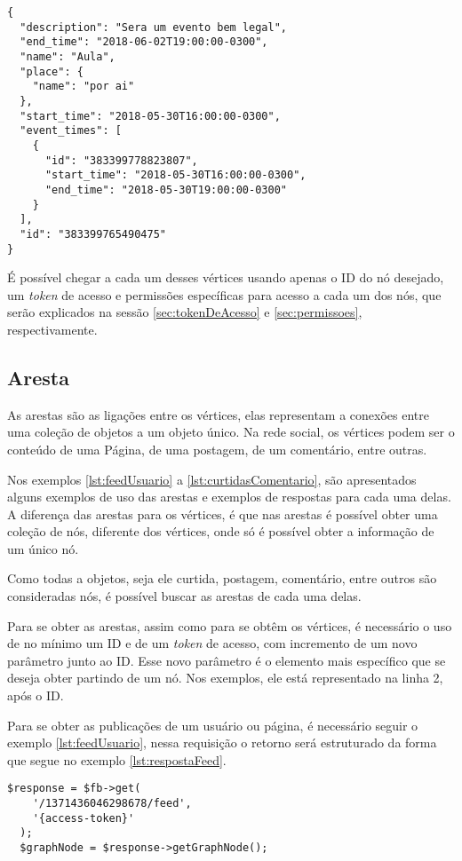 \begin{lstlisting}[caption={Resposta do servidor a uma requisição \ref{lst:evento} (Evento)},label={lst:retornoEvento}]
{
  "description": "Sera um evento bem legal",
  "end_time": "2018-06-02T19:00:00-0300",
  "name": "Aula",
  "place": {
    "name": "por ai"
  },
  "start_time": "2018-05-30T16:00:00-0300",
  "event_times": [
    {
      "id": "383399778823807",
      "start_time": "2018-05-30T16:00:00-0300",
      "end_time": "2018-05-30T19:00:00-0300"
    }
  ],
  "id": "383399765490475"
}
\end{lstlisting}

É possível chegar a cada um desses vértices usando apenas o ID do nó desejado, um \textit{token} de acesso e permissões específicas para acesso a cada um dos nós, que serão explicados na sessão \ref{sec:tokenDeAcesso} e \ref{sec:permissoes}, respectivamente.

\subsection{Aresta}
As arestas são as ligações entre os vértices, elas representam a conexões entre uma coleção de objetos a um objeto único. Na rede social, os vértices podem ser o conteúdo de uma Página, de uma postagem, de um comentário, entre outras.

Nos exemplos \ref{lst:feedUsuario} a \ref{lst:curtidasComentario}, são apresentados alguns exemplos de uso das arestas e exemplos de respostas para cada uma delas. A diferença das arestas para os vértices, é que nas arestas é possível obter uma coleção de nós, diferente dos vértices, onde só é possível obter a informação de um único nó.

Como todas a objetos, seja ele curtida, postagem, comentário, entre outros são consideradas nós, é possível buscar as arestas de cada uma delas.

Para se obter as arestas, assim como para se obtêm os vértices, é necessário o uso de no mínimo um ID e de um \textit{token} de acesso, com incremento de um novo parâmetro junto ao ID. Esse novo parâmetro é o elemento mais específico que se deseja obter partindo de um nó. Nos exemplos, ele está representado na linha 2, após o ID.

Para se obter as publicações de um usuário ou página, é necessário seguir o exemplo \ref{lst:feedUsuario}, nessa requisição o retorno será estruturado da forma que segue no exemplo \ref{lst:respostaFeed}.

\begin{lstlisting}[caption={Requisitando todas as publicações de um usuário},label={lst:feedUsuario}]
  $response = $fb->get( 
    '/1371436046298678/feed', 
    '{access-token}'
  );
  $graphNode = $response->getGraphNode();
\end{lstlisting}

